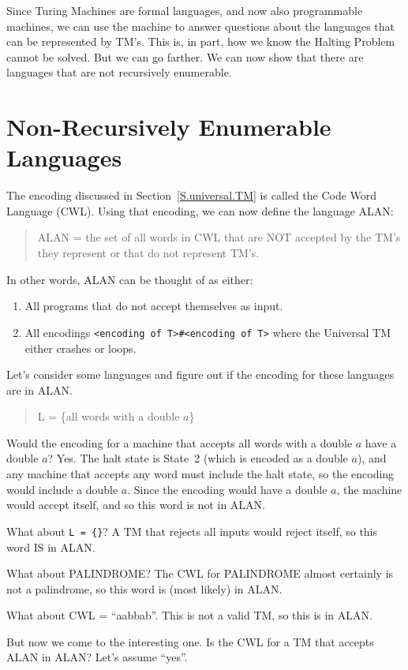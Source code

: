\documentclass[letterpaper,12pt,openany,reqno]{book}%
\begin{document}
Since Turing Machines are formal languages, and now also programmable machines, we can use the machine to answer questions about the languages that can be represented by TM's. This is, in part, how we know the Halting Problem cannot be solved. But we can go farther. We can now show that there are languages that are not recursively enumerable. 

\section{Non-Recursively Enumerable Languages}
The encoding discussed in Section~\ref{S.universal.TM} is called the Code Word Language (CWL). Using that encoding, we can now define the language ALAN:
\begin{quote}
ALAN = the set of all words in CWL that are NOT accepted by the TM's they represent or that do not represent TM's.
\end{quote}
In other words, ALAN can be thought of as either:
\begin{enumerate}
\item All programs that do not accept themselves as input.
\item All encodings \verb;<encoding of T>#<encoding of T>; where the Universal TM either crashes or loops.
\end{enumerate}
Let's consider some languages and figure out if the encoding for these languages are in ALAN.
\begin{quote}
L = \{all words with a double $a$\}
\end{quote}
Would the encoding for a machine that accepts all words with a double $a$ have a double $a$? Yes. The halt state is State~2 (which is encoded as a double $a$), and any machine that accepts any word must include the halt state, so the encoding would include a double $a$. Since the encoding would have a double $a$, the machine would accept itself, and so this word is not in ALAN.

What about \verb;L = {};? A TM that rejects all inputs would reject itself, so this word IS in ALAN.

What about PALINDROME? The CWL for PALINDROME almost certainly is not a palindrome, so this word is (most likely) in ALAN.

What about CWL = ``aabbab''. This is not a valid TM, so this is in ALAN.

But now we come to the interesting one. Is the CWL for a TM that accepts ALAN in ALAN? Let's assume ``yes''.
\end{document}
